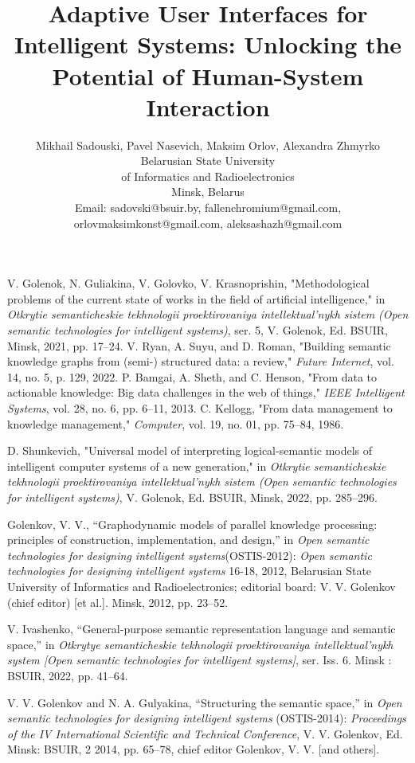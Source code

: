 \documentclass[10pt]{article}
\title{\Huge \textbf{Adaptive User Interfaces for Intelligent
Systems: Unlocking the Potential of
Human-System Interaction}}
\author{ \small Mikhail Sadouski, Pavel Nasevich, Maksim Orlov, Alexandra Zhmyrko \\ \small  Belarusian State University \\ \small of Informatics and Radioelectronics \\ \small Minsk, Belarus \\ \small Email: sadovski@bsuir.by, fallenchromium@gmail.com, orlovmaksimkonst@gmail.com, aleksashazh@gmail.com}
\date{}
\begin{document}
\footnotesize
\twocolumn
\justifying

\begin{thebibliography}{99}

\setlength{\parskip}{0pt}

 V. Golenok, N. Guliakina, V. Golovko, V. Krasnoprishin, "Methodological problems of the current state of works in the field of artificial intelligence," in \textit{Otkrytie semanticheskie tekhnologii proektirovaniya intellektual’nykh sistem (Open semantic technologies for intelligent systems)}, ser. 5, V. Golenok, Ed. BSUIR, Minsk, 2021, pp. 17–24.
 V. Ryan, A. Suyu, and D. Roman, "Building semantic 
knowledge graphs from (semi-) structured data: a review," \textit{Future Internet}, vol. 14, no. 5, p. 129, 2022.
 P. Bamgai, A. Sheth, and C. Henson, "From data to actionable knowledge: Big data challenges in the web of things," \textit{IEEE Intelligent Systems}, vol. 28, no. 6, pp. 6–11, 2013.
 C. Kellogg, "From data management to knowledge management," \textit{Computer}, vol. 19, no. 01, pp. 75–84, 1986.

 D. Shunkevich, "Universal model of interpreting logical-semantic models of intelligent computer systems of a new generation," in \textit{Otkrytie semanticheskie tekhnologii proektirovaniya intellektual’nykh sistem (Open semantic technologies for intelligent systems)}, V. Golenok, Ed. BSUIR, Minsk, 2022, pp. 285–296.

Golenkov, V. V., “Graphodynamic models of parallel knowledge
processing: principles of construction, implementation, and design,”
in \textit{Open semantic technologies for designing intelligent
systems}(OSTIS-2012): \textit{Open semantic technologies for designing intelligent systems} 16-18, 2012,
Belarusian State University of Informatics and Radioelectronics;
editorial board: V. V. Golenkov (chief editor) [et al.]. Minsk,
2012, pp. 23–52.

 V. Ivashenko, “General-purpose semantic representation language
and semantic space,” in \textit{Otkrytye semanticheskie tekhnologii
proektirovaniya intellektual’nykh system [Open semantic technologies
for intelligent systems]}, ser. Iss. 6. Minsk : BSUIR, 2022,
pp. 41–64.

 V. V. Golenkov and N. A. Gulyakina, “Structuring the semantic
space,” in \textit{Open semantic technologies for designing intelligent
systems} (OSTIS-2014): \textit{Proceedings of the IV International Scientific
and Technical Conference}, V. V. Golenkov, Ed. Minsk:
BSUIR, 2 2014, pp. 65–78, chief editor Golenkov, V. V. [and
others].


\end{thebibliography}
\end{document}
